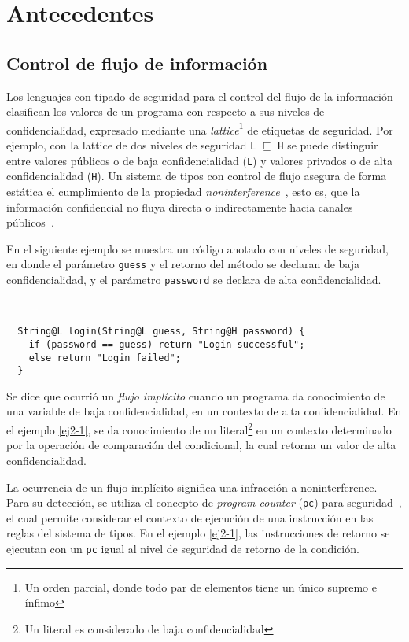 \chapter{Antecedentes}

\section{Control de flujo de información}
Los lenguajes con tipado de seguridad para el control del flujo de la información clasifican los valores de un programa con respecto a sus niveles de confidencialidad, expresado mediante una \emph{lattice}\footnote{Un orden parcial, donde todo par de elementos tiene un único supremo e ínfimo} de etiquetas de seguridad. Por ejemplo, con la lattice de dos niveles de seguridad \texttt{L} $\sqsubseteq$ \texttt{H} se puede distinguir entre valores públicos o de baja confidencialidad (\texttt{L}) y valores privados o de alta confidencialidad (\texttt{H}). Un sistema de tipos con control de flujo asegura de forma estática el cumplimiento de la propiedad \emph{noninterference}~\cite{noninterference}, esto es, que la información confidencial no fluya directa o indirectamente hacia canales públicos~\cite{volpanoAl:S96}.

En el siguiente ejemplo se muestra un código anotado con niveles de seguridad, en donde el parámetro \texttt{guess} y el retorno del método se declaran de baja confidencialidad, y el parámetro \texttt{password} se declara de alta confidencialidad.

\begin{ej} \ \\
  \normalfont
  \label{ej2-1}
\begin{lstlisting}
  String@L login(String@L guess, String@H password) {
    if (password == guess) return "Login successful";
    else return "Login failed";
  }
\end{lstlisting}
\end{ej}

Se dice que ocurrió un \emph{flujo implícito} cuando un programa da conocimiento de una variable de baja confidencialidad, en un contexto de alta confidencialidad. En el ejemplo \ref{ej2-1}, se da conocimiento de un literal\footnote{Un literal es considerado de baja confidencialidad} en un contexto determinado por la operación de comparación del condicional, la cual retorna un valor de alta confidencialidad.

La ocurrencia de un flujo implícito significa una infracción a noninterference. Para su detección, se utiliza el concepto de \textit{program counter} (\texttt{pc}) para seguridad~\cite{pc}, el cual permite considerar el contexto de ejecución de una instrucción en las reglas del sistema de tipos. En el ejemplo \ref{ej2-1}, las instrucciones de retorno se ejecutan con un \texttt{pc} igual al nivel de seguridad de retorno de la condición.

